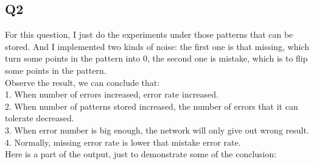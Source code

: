 \documentclass{article}
\begin{document}
  \subsection{Q2}
  For this question, I just do the experiments under those patterns that can be
  stored. And I implemented two kinds of noise: the first one is that missing,
  which turn some points in the pattern into 0, the second one is mistake, which
  is to flip some points in the pattern.\\
  Observe the result, we can conclude that:\\
  1. When number of errors increased, error rate increased.\\
  2. When number of patterns stored increased, the number of errors that it can
  tolerate decreased.\\
  3. When error number is big enough, the network will only give out wrong
  result.\\
  4. Normally, missing error rate is lower that mistake error rate.\\
  Here is a part of the output, just to demonstrate some of the conclusion:
\end{document}
